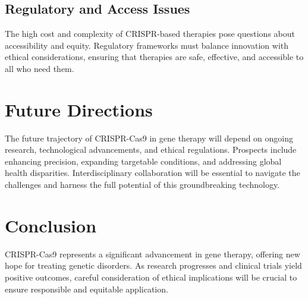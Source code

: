 \documentclass[12pt]{article}
\begin{document}
\subsection{Regulatory and Access Issues}
The high cost and complexity of CRISPR-based therapies pose questions about accessibility and equity. Regulatory frameworks must balance innovation with ethical considerations, ensuring that therapies are safe, effective, and accessible to all who need them.

\section{Future Directions}
The future trajectory of CRISPR-Cas9 in gene therapy will depend on ongoing research, technological advancements, and ethical regulations. Prospects include enhancing precision, expanding targetable conditions, and addressing global health disparities. Interdisciplinary collaboration will be essential to navigate the challenges and harness the full potential of this groundbreaking technology.

\section{Conclusion}
CRISPR-Cas9 represents a significant advancement in gene therapy, offering new hope for treating genetic disorders. As research progresses and clinical trials yield positive outcomes, careful consideration of ethical implications will be crucial to ensure responsible and equitable application.



\end{document}
